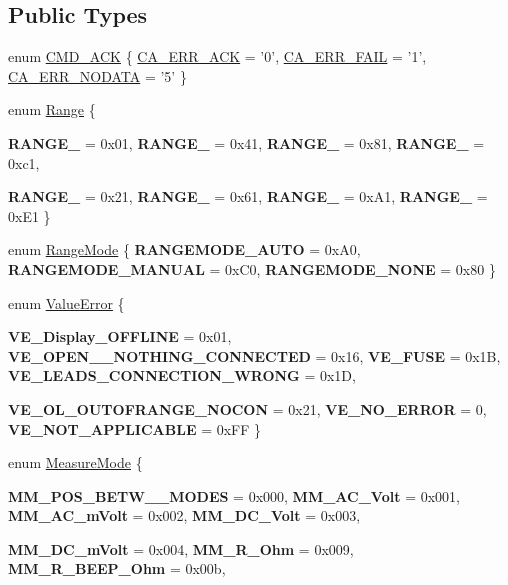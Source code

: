 \subsection*{Public Types}
\begin{DoxyCompactItemize}
\item 
enum \hyperlink{classFluke_1_1Fluke189_a1dc3e71946821b69a497313c15a563d6}{CMD\_\-ACK} \{ \hyperlink{classFluke_1_1Fluke189_a1dc3e71946821b69a497313c15a563d6adfe46b4cef1f6ea04b2f3b0abee5092c}{CA\_\-ERR\_\-ACK} =  '0', 
\hyperlink{classFluke_1_1Fluke189_a1dc3e71946821b69a497313c15a563d6ac157cd20279d9b6cba70f8da4ffbeb35}{CA\_\-ERR\_\-FAIL} =  '1', 
\hyperlink{classFluke_1_1Fluke189_a1dc3e71946821b69a497313c15a563d6aeb64e037c0e59e7577ba976ee3b25a20}{CA\_\-ERR\_\-NODATA} =  '5'
 \}
\item 
enum \hyperlink{classFluke_1_1Fluke189_a8112c52d8588d0cce468376e2faa83f5}{Range} \{ \par
{\bfseries RANGE\_} = 0x01, 
{\bfseries RANGE\_} = 0x41, 
{\bfseries RANGE\_} = 0x81, 
{\bfseries RANGE\_} = 0xc1, 
\par
{\bfseries RANGE\_} = 0x21, 
{\bfseries RANGE\_} = 0x61, 
{\bfseries RANGE\_} = 0xA1, 
{\bfseries RANGE\_} = 0xE1
 \}
\item 
enum \hyperlink{classFluke_1_1Fluke189_a470ac0e0a6e44ca3b33d2307ef29f37d}{RangeMode} \{ {\bfseries RANGEMODE\_\-AUTO} = 0xA0, 
{\bfseries RANGEMODE\_\-MANUAL} = 0xC0, 
{\bfseries RANGEMODE\_\-NONE} = 0x80
 \}
\item 
enum \hyperlink{classFluke_1_1Fluke189_a5dc0eaffde0a29a64cbcbd50d4178491}{ValueError} \{ \par
{\bfseries VE\_\-Display\_\-OFFLINE} = 0x01, 
{\bfseries VE\_\-OPEN\_\-\_\-NOTHING\_\-CONNECTED} = 0x16, 
{\bfseries VE\_\-FUSE} = 0x1B, 
{\bfseries VE\_\-LEADS\_\-CONNECTION\_\-WRONG} = 0x1D, 
\par
{\bfseries VE\_\-OL\_\-OUTOFRANGE\_\-NOCON} = 0x21, 
{\bfseries VE\_\-NO\_\-ERROR} = 0, 
{\bfseries VE\_\-NOT\_\-APPLICABLE} = 0xFF
 \}
\item 
enum \hyperlink{classFluke_1_1Fluke189_a9122f47da123e82f492c9cfcb29e5f2e}{MeasureMode} \{ \par
{\bfseries MM\_\-POS\_\-BETW\_\_\-MODES} = 0x000, 
{\bfseries MM\_\-AC\_\-Volt} = 0x001, 
{\bfseries MM\_\-AC\_\-mVolt} = 0x002, 
{\bfseries MM\_\-DC\_\-Volt} = 0x003, 
\par
{\bfseries MM\_\-DC\_\-mVolt} = 0x004, 
{\bfseries MM\_\-R\_\-Ohm} = 0x009, 
{\bfseries MM\_\-R\_\-BEEP\_\-Ohm} = 0x00b, 

\end{DoxyCompactItemize}
